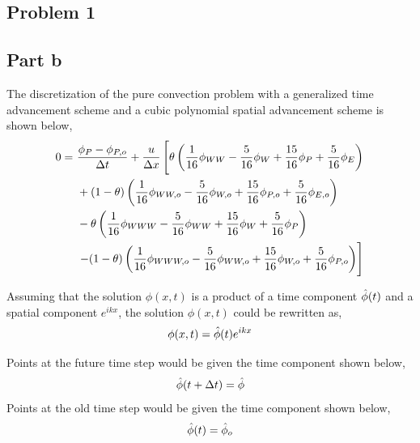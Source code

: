 \documentclass[class=report, 12pt, crop=false]{standalone}
\begin{document}
\begin{center}
\section{Problem 1}

\subsection{Part b}


The discretization of the pure convection problem with a generalized time advancement scheme and a cubic polynomial spatial advancement scheme is shown below,
\begin{equation*}
\begin{split}
0 =\,\, &\frac{\phi_{P} - \phi_{P,o}}{\Delta t} + \frac{u}{\Delta x}\left[ \theta\left(\frac{1}{16}\phi_{WW} - \frac{5}{16}\phi_{W} + \frac{15}{16}\phi_{P} + \frac{5}{16}\phi_{E}\right) \right.
\\ & + (1-\theta)\left( \frac{1}{16}\phi_{WW,o} - \frac{5}{16}\phi_{W,o} + \frac{15}{16}\phi_{P,o} + \frac{5}{16}\phi_{E,o}\right)
\\ & -\theta \left( \frac{1}{16}\phi_{WWW} - \frac{5}{16}\phi_{WW} + \frac{15}{16}\phi_{W} + \frac{5}{16}\phi_{P}\right)
\\ & \left. - (1-\theta)\left( \frac{1}{16}\phi_{WWW,o} - \frac{5}{16}\phi_{WW,o} + \frac{15}{16}\phi_{W,o} + \frac{5}{16}\phi_{P,o}\right)\right]
\end{split}
\end{equation*}


Assuming that the solution $\phi(x,t)$ is a product of a time component $\hat{\phi}(t)$ and a spatial component $e^{ikx}$, the solution $\phi(x,t)$ could be rewritten as,
$$\phi(x,t) = \hat{\phi}(t)e^{ikx}$$


Points at the future time step would be given the time component shown below,
$$\hat{\phi}(t+\Delta t) = \hat{\phi}$$
Points at the old time step would be given the time component shown below,
$$\hat{\phi}(t) = \hat{\phi}_o$$


\end{center}
\end{document}

